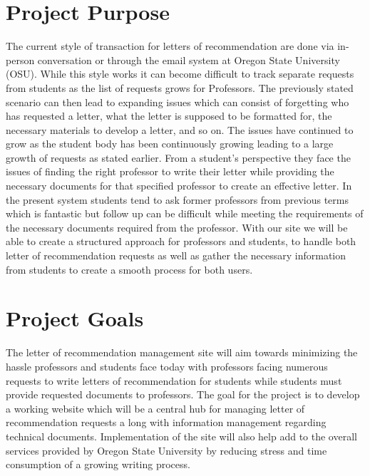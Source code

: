 \documentclass[draftclsnofoot, onecolumn, letterpaper, 10pt]{IEEEtran}
\begin{document}
\section{Project Purpose}
The current style of transaction for letters of recommendation are done via in-person conversation or through the email system at Oregon State University (OSU). While this style works it can become difficult to track separate requests from students as the list of requests grows for Professors. The previously stated scenario can then lead to expanding issues which can consist of forgetting who has requested a letter, what the letter is supposed to be formatted for, the necessary materials to develop a letter, and so on. The issues have continued to grow as the student body has been continuously growing leading to a large growth of requests as stated earlier. From a student’s perspective they face the issues of finding the right professor to write their letter while providing the necessary documents for that specified professor to create an effective letter. In the present system students tend to ask former professors from previous terms which is fantastic but follow up can be difficult while meeting the requirements of the necessary documents required from the professor. With our site we will be able to create a structured approach for professors and students, to handle both letter of recommendation requests as well as gather the necessary information from students to create a smooth process for both users.

\section{Project Goals}
The letter of recommendation management site will aim towards minimizing the hassle professors and students face today with professors facing numerous requests to write letters of recommendation for students while students must provide requested documents to professors. The goal for the project is to develop a working website which will be a central hub for managing letter of recommendation requests a long with information management regarding technical documents. Implementation of the site will also help add to the overall services provided by Oregon State University by reducing stress and time consumption of a growing writing process.
\end{document}
